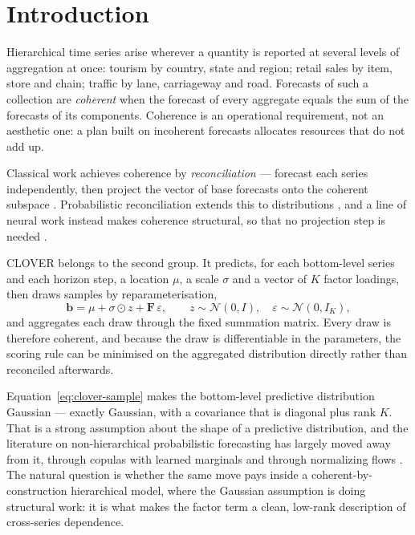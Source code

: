 \documentclass[11pt]{article}
\newcommand{\bvec}{\mathbf{b}}
\newcommand{\Fmat}{\mathbf{F}}
\begin{document}
\section{Introduction}

Hierarchical time series arise wherever a quantity is reported at several levels of
aggregation at once: tourism by country, state and region; retail sales by item,
store and chain; traffic by lane, carriageway and road. Forecasts of such a
collection are \emph{coherent} when the forecast of every aggregate equals the sum
of the forecasts of its components. Coherence is an operational requirement, not an
aesthetic one: a plan built on incoherent forecasts allocates resources that do not
add up.

Classical work achieves coherence by \emph{reconciliation} --- forecast each series
independently, then project the vector of base forecasts onto the coherent subspace
\citep{hyndman2011optimal,wickramasuriya2019optimal}. Probabilistic reconciliation
extends this to distributions \citep{taieb2017coherent,panagiotelis2023probabilistic},
and a line of neural work instead makes coherence structural, so that no projection
step is needed \citep{rangapuram2021endtoend,olivares2024clover}.

CLOVER \citep{olivares2024clover} belongs to the second group. It predicts, for
each bottom-level series and each horizon step, a location $\mu$, a scale $\sigma$
and a vector of $K$ factor loadings, then draws samples by reparameterisation,
\begin{equation}
\bvec = \mu + \sigma \odot z + \Fmat\,\varepsilon ,
\qquad z \sim \mathcal{N}(0, I), \quad \varepsilon \sim \mathcal{N}(0, I_K),
\label{eq:clover-sample}
\end{equation}
and aggregates each draw through the fixed summation matrix. Every draw is
therefore coherent, and because the draw is differentiable in the parameters, the
scoring rule can be minimised on the aggregated distribution directly rather than
reconciled afterwards.

Equation~\eqref{eq:clover-sample} makes the bottom-level predictive distribution
Gaussian --- exactly Gaussian, with a covariance that is diagonal plus rank $K$.
That is a strong assumption about the shape of a predictive distribution, and the
literature on non-hierarchical probabilistic forecasting has largely moved away
from it, through copulas with learned marginals \citep{salinas2019copula} and
through normalizing flows \citep{rasul2021multivariate}. The natural question is
whether the same move pays inside a coherent-by-construction hierarchical model,
where the Gaussian assumption is doing structural work: it is what makes the
factor term a clean, low-rank description of cross-series dependence.
\end{document}
